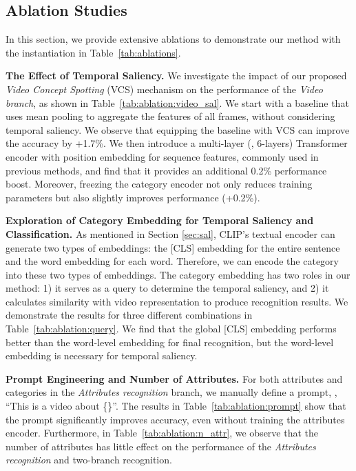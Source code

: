 \documentclass[10pt,twocolumn,letterpaper]{article}
\begin{document}
\subsection{Ablation Studies}
\label{ab:k400}
In this section, we provide extensive ablations to demonstrate our method with the instantiation in Table~\ref{tab:ablations}. 




\noindent\textbf{The Effect of Temporal Saliency.}
We investigate the impact of our proposed \emph{Video Concept Spotting} (VCS) mechanism on the performance of the \emph{Video branch}, as shown in Table~\ref{tab:ablation:video_sal}. We start with a baseline that uses mean pooling to aggregate the features of all frames, without considering temporal saliency. We observe that equipping the baseline with VCS can improve the accuracy by +1.7\%.
We then introduce a multi-layer (\eg, 6-layers) Transformer encoder with position embedding for sequence features, commonly used in previous methods, and find that it provides an additional 0.2\% performance boost. Moreover, freezing the category encoder not only reduces training parameters but also slightly improves performance (+0.2\%).




\noindent\textbf{Exploration of Category Embedding for Temporal Saliency and Classification.} 
As mentioned in Section \ref{sec:sal}, CLIP's textual encoder can generate two types of embeddings: the [CLS] embedding for the entire sentence and the word embedding for each word.
Therefore, we can encode the category into these two types of embeddings.
The category embedding has two roles in our method: 1) it serves as a query to determine the temporal saliency, and 2) it calculates similarity with video representation to produce recognition results.
We demonstrate the results for three different combinations in Table~\ref{tab:ablation:query}.
We find that the global [CLS] embedding performs better than the word-level embedding for final recognition, but the word-level embedding is necessary for temporal saliency.


\noindent\textbf{Prompt Engineering and Number of Attributes.}
For both attributes and categories in the \emph{Attributes recognition} branch, we manually define a prompt, \ie, ``This is a video about \{\}''. The results in Table~\ref{tab:ablation:prompt} show that the prompt significantly improves accuracy, even without training the attributes encoder. Furthermore, in Table~\ref{tab:ablation:n_attr}, we observe that the number of attributes has little effect on the performance of the \emph{Attributes recognition} and two-branch recognition.
\end{document}
